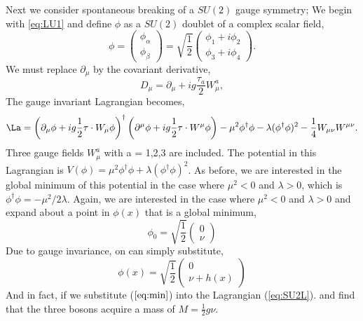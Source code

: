 Next we consider spontaneous breaking of a $SU(2)$ gauge symmetry;
We begin with \ref{eq:LU1} and define $\phi$ as a $SU(2)$ doublet 
of a complex scalar field, %
\begin{equation}
\phi=\left(
    \begin{array}{c}
      \phi_{\alpha} \\
      \phi_{\beta}
    \end{array}
  \right) =
  \sqrt{\frac{1}{2}} 
  \left(
    \begin{array}{c}
      \phi_{1}+i\phi_{2} \\
      \phi_{3}+i\phi_{4}
    \end{array}
  \right) .
  \label{eq:phidoublet}
\end{equation}
We must replace $\partial_{\mu}$ by the covariant derivative,
\begin{equation}
D_{\mu}=\partial_{\mu}+ig\frac{\tau_{a}}{2}W_{\mu}^{a},
\end{equation}
The gauge invariant Lagrangian becomes,
\begin{equation}
\La=
\left(\partial_{\mu}\phi + ig \frac{1}{2} \tau \cdot W_{\mu}\phi  \right)^{\dagger}
\left(\partial^{\mu}\phi + ig \frac{1}{2} \tau \cdot W^{\mu}\phi  \right)
-\mu^{2}\phi^{\dagger}\phi
-\lambda (\phi^{\dagger}\phi)^{2}
-\frac{1}{4}W_{\mu\nu}W^{\mu\nu}.
\label{eq:SU2L}
\end{equation}
Three gauge fields $W_{\mu}^{a}$ with a = 1,2,3 are included.
The potential in this Lagrangian is $V(\phi)=\mu^{2}\phi^{\dagger}\phi+\lambda (\phi^{\dagger}\phi)^{2}$.
As before, we are interested in the global minimum of this potential
in the case where $\mu^{2}<0$ and $\lambda>0$, which is
$\phi^{\dagger}\phi=-\mu^{2}/2\lambda$. Again, we are interested in the case where $\mu^{2}<0$ and $\lambda>0$
and expand about a point in $\phi(x)$ that is a global minimum,
\begin{equation}
\phi_{0}=\sqrt{\frac{1}{2}}
\left(
\begin{array}{c}
      0 \\
      \nu
    \end{array}
\right)
\label{eq:min}
\end{equation}
Due to gauge invariance, on can simply substitute,
\begin{equation}
\phi(x)=\sqrt{\frac{1}{2}}
\left(
\begin{array}{c}
      0 \\
      \nu+h(x)
    \end{array}
\right)
\label{eq:min}
\end{equation}
And in fact, if we substitute ($\ref{eq:min}$) into the Lagrangian (\ref{eq:SU2L}).
and find that the three bosons acquire a mass of $M=\frac{1}{2}g\nu$.

